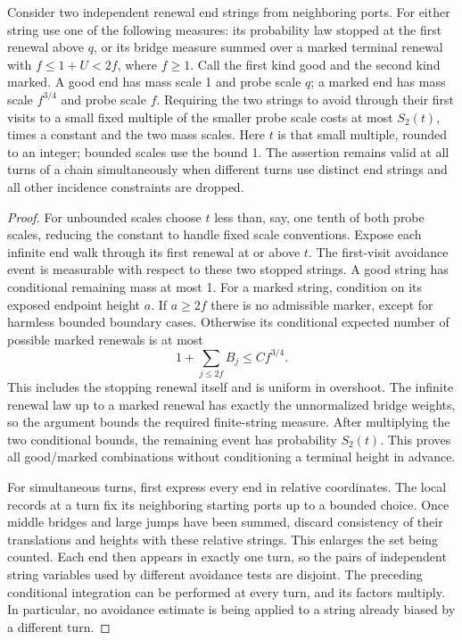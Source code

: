\begin{lemma}\label{09_fast_paths:marked-conditioning}
Consider two independent renewal end strings from neighboring ports.
For either string use one of the following measures: its probability
law stopped at the first renewal above \(q\), or its bridge measure
summed over a marked terminal renewal with
\(f\le1+U<2f\), where \(f\ge1\).  Call the first kind good and the
second kind marked.  A good end has mass scale 1 and probe scale \(q\);
a marked end has mass scale \(f^{3/4}\) and probe scale \(f\).
Requiring the two strings to avoid through their first visits to a
small fixed multiple of the smaller probe scale costs at most
\(S_2(t)\), times a constant and the two mass scales.  Here \(t\)
is that small multiple, rounded to an integer; bounded scales use
the bound 1.  The assertion remains valid at all turns of a chain
simultaneously when different turns use distinct end strings and all
other incidence constraints are dropped.
\end{lemma}
\begin{proof}
For unbounded scales choose \(t\) less than, say, one tenth of both
probe scales, reducing the constant to handle fixed scale conventions.
Expose each infinite end walk through its first renewal at or above
\(t\).  The first-visit avoidance event is measurable with respect
to these two stopped strings.  A good string has conditional remaining
mass at most 1.  For a marked string, condition on its exposed endpoint
height \(a\).  If \(a\ge2f\) there is no admissible marker, except
for harmless bounded boundary cases.  Otherwise its conditional
expected number of possible marked renewals is at most
\[
                       1+\sum_{j\le2f}B_j\le Cf^{3/4}.
\]
This includes the stopping renewal itself and is uniform in overshoot.
The infinite renewal law up to a marked renewal has exactly the
unnormalized bridge weights, so the argument bounds the required
finite-string measure.  After multiplying the two conditional bounds,
the remaining event has probability \(S_2(t)\).  This proves all
good/marked combinations without conditioning a terminal height in
advance.

For simultaneous turns, first express every end in relative coordinates.
The local records at a turn fix its neighboring starting ports up to a
bounded choice.  Once middle bridges and large jumps have been summed,
discard consistency of their translations and heights with these
relative strings.  This enlarges the set being counted.  Each end then
appears in exactly one turn, so the pairs of independent string variables
used by different avoidance tests are disjoint.  The preceding
conditional integration can be performed at every turn, and its
factors multiply.  In particular, no avoidance estimate is being
applied to a string already biased by a different turn.
\end{proof}

